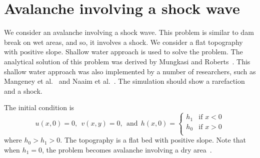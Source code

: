 
\section{Avalanche involving a shock wave}

We consider an avalanche involving a shock wave.
This problem is similar to dam break on wet areas, and so, it involves a shock. We consider a flat topography with positive slope. Shallow water approach is used to solve the problem. The analytical solution of this problem was derived by Mungkasi and Roberts~\cite{MR2012PAAG}. This shallow water approach was also implemented by a number of researchers, such as Mangeney et al.~\cite{MHR2000} and Naaim et al.~\cite{NVC1997}. The simulation should show a rarefaction and a shock. 



The initial condition is
\begin{equation} \label{eq:dap_init_wet}
u(x,0)=0, ~~v(x,y)=0, ~~\textrm{and}~~
h(x,0) = \left\{ \begin{array}{ll}
h_1 & \textrm{if $x < 0$}\\
h_0 & \textrm{if $x > 0$}\\
\end{array} \right.
\end{equation}
where $h_0>h_1>0$. The topography is a flat bed with positive slope. Note that when $h_1=0$, the problem becomes avalanche involving a dry area~\cite{MR2011DA}.

